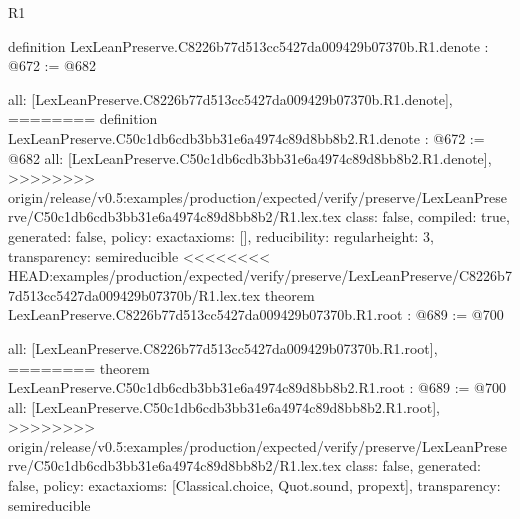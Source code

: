 \begin{lexlean}{R1}
\begin{coremodule}
{{{{{{definition LexLeanPreserve.C8226b77d513cc5427da009429b07370b.R1.denote : @672 := @682 {
  all: [LexLeanPreserve.C8226b77d513cc5427da009429b07370b.R1.denote],
========
definition LexLeanPreserve.C50c1db6cdb3bb31e6a4974c89d8bb8b2.R1.denote : @672 := @682 {
  all: [LexLeanPreserve.C50c1db6cdb3bb31e6a4974c89d8bb8b2.R1.denote],
>>>>>>>> origin/release/v0.5:examples/production/expected/verify/preserve/LexLeanPreserve/C50c1db6cdb3bb31e6a4974c89d8bb8b2/R1.lex.tex
  class: false,
  compiled: true,
  generated: false,
  policy: exact{axioms: []},
  reducibility: regular{height: 3},
  transparency: semireducible
}
<<<<<<<< HEAD:examples/production/expected/verify/preserve/LexLeanPreserve/C8226b77d513cc5427da009429b07370b/R1.lex.tex
theorem LexLeanPreserve.C8226b77d513cc5427da009429b07370b.R1.root : @689 := @700 {
  all: [LexLeanPreserve.C8226b77d513cc5427da009429b07370b.R1.root],
========
theorem LexLeanPreserve.C50c1db6cdb3bb31e6a4974c89d8bb8b2.R1.root : @689 := @700 {
  all: [LexLeanPreserve.C50c1db6cdb3bb31e6a4974c89d8bb8b2.R1.root],
>>>>>>>> origin/release/v0.5:examples/production/expected/verify/preserve/LexLeanPreserve/C50c1db6cdb3bb31e6a4974c89d8bb8b2/R1.lex.tex
  class: false,
  generated: false,
  policy: exact{axioms: [Classical.choice, Quot.sound, propext]},
  transparency: semireducible
}

}}}}}}}}
\end{coremodule}
\end{lexlean}
